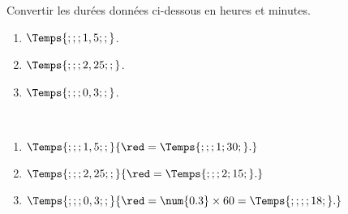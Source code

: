 \begin{exercice}
    Convertir les durées données ci-dessous en heures et minutes.
    \begin{enumerate}
       \item $\Temps{;;;1,5;;}$.
       \item $\Temps{;;;2,25;;}$.
       \item $\Temps{;;;0,3;;}$.
    \end{enumerate}
 \end{exercice}
 
 \begin{corrige}
    \ \\ [-5mm]
    \begin{enumerate}
       \item $\Temps{;;;1,5;;} {\red = \Temps{;;;1;30;}.}$
       \item $\Temps{;;;2,25;;}{\red = \Temps{;;;2;15;}.}$
       \item $\Temps{;;;0,3;;} {\red = \num{0.3}\times 60 = \Temps{;;;;18;}.}$
    \end{enumerate}
 \end{corrige}

